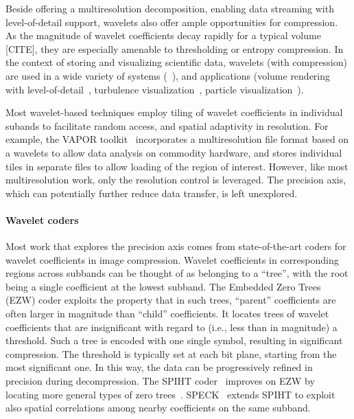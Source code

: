 Beside offering a multiresolution decomposition, enabling data streaming with level-of-detail
support, wavelets also offer ample opportunities for compression. As the magnitude of wavelet
coefficients decay rapidly for a typical volume [CITE], they are especially amenable to thresholding
or entropy compression. In the context of storing and visualizing scientific data, wavelets (with
compression) are used in a wide variety of systems
(~\cite{multires_toolkit2003,vapor2007,woodring2011}), and applications (volume rendering with
level-of-detail~\cite{wavelet-compression-interactive-vis,multires-framework,rapid-compression-volume,interactive-rendering-large-volume,multires-volume-rendering},
turbulence visualization~\cite{treib}, particle visualization~\cite{sph-octree}).

Most wavelet-based techniques employ tiling of wavelet coefficients in individual subands to
facilitate random access, and spatial adaptivity in resolution. For example, the VAPOR
toolkit~\cite{vapor2007} incorporates a multiresolution file format based on a wavelets to allow
data analysis on commodity hardware, and stores individual tiles in separate files to allow loading
of the region of interest. However, like most multiresolution work, only the resolution control is
leveraged. The precision axis, which can potentially further reduce data transfer, is left
unexplored.

\paragraph{\textbf{Wavelet coders}}
Most work that explores the precision axis comes from state-of-the-art coders for wavelet
coefficients in image compression. Wavelet coefficients in corresponding regions across subbands can
be thought of as belonging to a ``tree'', with the root being a single coefficient at the lowest
subband. The Embedded Zero Trees (EZW) coder exploits the property that in such trees, ``parent''
coefficients are often larger in magnitude than ``child'' coefficients. It locates trees of wavelet
coefficients that are insignificant with regard to (i.e., less than in magnitude) a threshold. Such
a tree is encoded with one single symbol, resulting in significant compression. The threshold is
typically set at each bit plane, starting from the most significant one. In this way, the data can
be progressively refined in precision during decompression. The SPIHT coder~\cite{spiht1996}
improves on EZW by locating more general types of zero trees~\cite{quantifying-coding-performance}.
SPECK~\cite{speck2004} extends SPIHT to exploit also spatial correlations among nearby coefficients
on the same subband.

